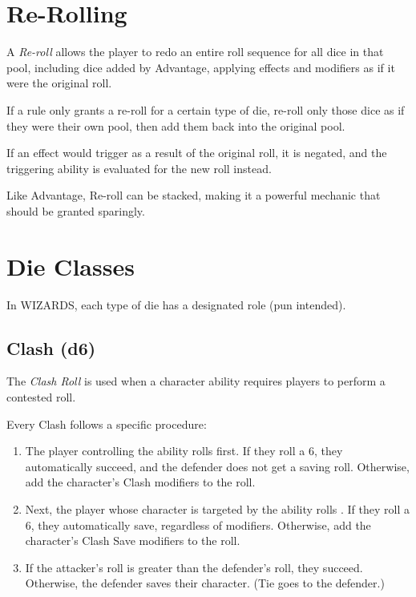 \section{Re-Rolling}
A \textit{Re-roll} allows the player to redo an entire roll sequence 
for all dice in that pool, including dice added by Advantage, 
applying effects and modifiers as if it were the original roll.

\vspace{0.4em}

If a rule only grants a re-roll for a certain type of die, 
re-roll only those dice as if they were their own pool,
then add them back into the original pool.

\vspace{0.4em}

If an effect would trigger as a result of the original roll, it is negated, 
and the triggering ability is evaluated for the new roll instead.

\vspace{0.4em}

Like Advantage, Re-roll can be stacked, 
making it a powerful mechanic that should be granted sparingly.


\section{Die Classes}
In WIZARDS, each type of die has a designated role (pun intended).


\subsection{Clash (d6)}
The \textit{Clash Roll} is used when a character ability requires players to perform a contested roll.

\vspace{0.4em}

Every Clash follows a specific procedure:

\begin{enumerate}
  \item The player controlling the ability rolls  first. 
  If they roll a 6, they automatically succeed, 
  and the defender does not get a saving roll.
  Otherwise, add the character's Clash modifiers to the roll.
  \item Next, the player whose character is targeted by the ability 
  rolls .
  If they roll a 6, they automatically save, regardless of modifiers.
  Otherwise, add the character's Clash Save modifiers to the roll.
  \item If the attacker's roll is greater than the defender's roll, 
  they succeed.
  Otherwise, the defender saves their character. 
  (Tie goes to the defender.)
\end{enumerate}


